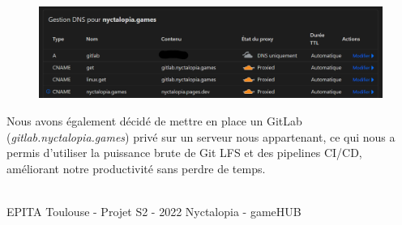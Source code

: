 \begin{figure}[H]
\centering
\begin{minipage}{.5\textwidth}
  \centering
  \centerline{\includegraphics[width=2\linewidth]{img/ui/dns.png}}
  \label{fig:dns}
\end{minipage}%
\end{figure}

Nous avons également décidé de mettre en place un GitLab (\emph{gitlab.nyctalopia.games}) privé sur un serveur nous appartenant, ce qui nous a permis d'utiliser la puissance brute de Git LFS et des pipelines CI/CD, améliorant notre productivité sans perdre de temps.

\vfill
\noindent\makebox[\linewidth]{\rule{.8\paperwidth}{.6pt}}\\[0.2cm]
EPITA Toulouse - Projet S2 - 2022 \hfill Nyctalopia - gameHUB
\noindent\makebox[\linewidth]{\rule{.8\paperwidth}{.6pt}}

\newpage